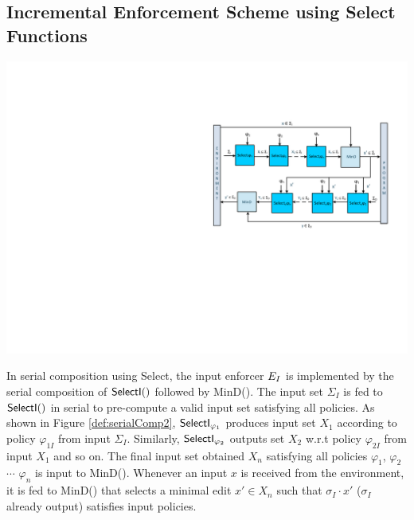 
\subsection{Incremental Enforcement Scheme using Select Functions}
\label{sec:framework:serial}

\begin{SingleColFigure}
	\centering
	\includegraphics[width=1.1\columnwidth]{fig/serial-composition2-ColourDiagram-cropped5.pdf}
	\label{fig:serialComp2}
\end{SingleColFigure}

In serial composition using Select, the input enforcer $E_{I}$ is implemented by the serial composition of $\mathsf{SelectI}()$ followed by MinD(). The input set $\Sigma_I$ is fed to $\mathsf{SelectI}()$ in serial to pre-compute a valid input set satisfying all policies. As shown in Figure \ref{def:serialComp2}, $\mathsf{SelectI}_{\varphi_{1}}$ produces input set $X_1$ according to policy $\varphi_{1I}$ from input $\Sigma_I$. Similarly, $\mathsf{SelectI}_{\varphi_{2}}$ outputs set $X_2$ w.r.t policy $\varphi_{2I}$ from input $X_1$ and so on. The final input set  obtained $X_n$ satisfying all policies $\varphi_1$, $\varphi_2$ $\cdots$ $\varphi_n$ is input to MinD(). Whenever an input $x$ is received from the environment, it is fed to MinD() that selects a minimal edit $x' \in X_n$  such that $\sigma_I \cdot x' $ ($\sigma_I$ already output) satisfies input policies. 

